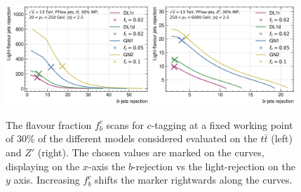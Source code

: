 \begin{figure}[h!]
  \centering
  \includegraphics[width=0.48\textwidth]{Images/FTAG/GN/GN2/fraction_scans/FractionScanPlot_tt_c.png}
  \includegraphics[width=0.48\textwidth]{Images/FTAG/GN/GN2/fraction_scans/FractionScanPlot_zp_c.png}
  \caption{The flavour fraction $f^c_b$ scans for $c$-tagging at a fixed working point of 30\% of the different models considered evaluated on the $t\bar{t}$ (left) and $Z'$ (right). The chosen values are marked on the curves, displaying on the $x$-axis the $b$-rejection vs the light-rejection on the $y$ axis. Increasing $f^c_b$ shifts the marker rightwards along the curves. }
  \label{fig:GNxscansfb}
\end{figure} 

